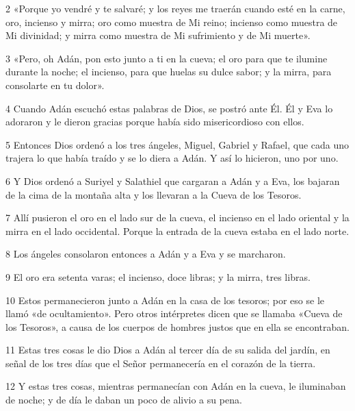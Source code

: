 \par 2 «Porque yo vendré y te salvaré; y los reyes me traerán cuando esté en la carne, oro, incienso y mirra; oro como muestra de Mi reino; incienso como muestra de Mi divinidad; y mirra como muestra de Mi sufrimiento y de Mi muerte».

\par 3 «Pero, oh Adán, pon esto junto a ti en la cueva; el oro para que te ilumine durante la noche; el incienso, para que huelas su dulce sabor; y la mirra, para consolarte en tu dolor».

\par 4 Cuando Adán escuchó estas palabras de Dios, se postró ante Él. Él y Eva lo adoraron y le dieron gracias porque había sido misericordioso con ellos.

\par 5 Entonces Dios ordenó a los tres ángeles, Miguel, Gabriel y Rafael, que cada uno trajera lo que había traído y se lo diera a Adán. Y así lo hicieron, uno por uno.

\par 6 Y Dios ordenó a Suriyel y Salathiel que cargaran a Adán y a Eva, los bajaran de la cima de la montaña alta y los llevaran a la Cueva de los Tesoros.

\par 7 Allí pusieron el oro en el lado sur de la cueva, el incienso en el lado oriental y la mirra en el lado occidental. Porque la entrada de la cueva estaba en el lado norte.

\par 8 Los ángeles consolaron entonces a Adán y a Eva y se marcharon.

\par 9 El oro era setenta varas; el incienso, doce libras; y la mirra, tres libras.

\par 10 Estos permanecieron junto a Adán en la casa de los tesoros; por eso se le llamó «de ocultamiento». Pero otros intérpretes dicen que se llamaba «Cueva de los Tesoros», a causa de los cuerpos de hombres justos que en ella se encontraban.

\par 11 Estas tres cosas le dio Dios a Adán al tercer día de su salida del jardín, en señal de los tres días que el Señor permanecería en el corazón de la tierra.

\par 12 Y estas tres cosas, mientras permanecían con Adán en la cueva, le iluminaban de noche; y de día le daban un poco de alivio a su pena.

